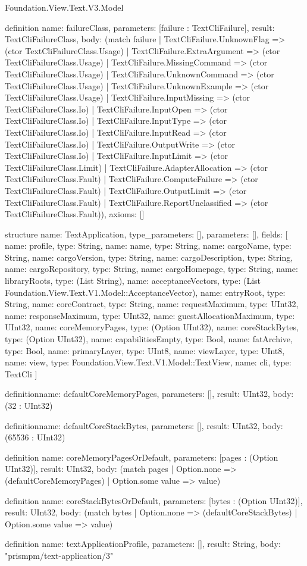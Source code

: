\begin{lexlean}{Foundation.View.Text.V3.Model}
\begin{semanticmodule}
definition{
  name: failureClass,
  parameters: [failure : TextCliFailure],
  result: TextCliFailureClass,
  body: (match failure
    | TextCliFailure.UnknownFlag => (ctor TextCliFailureClass.Usage)
    | TextCliFailure.ExtraArgument => (ctor TextCliFailureClass.Usage)
    | TextCliFailure.MissingCommand => (ctor TextCliFailureClass.Usage)
    | TextCliFailure.UnknownCommand => (ctor TextCliFailureClass.Usage)
    | TextCliFailure.UnknownExample => (ctor TextCliFailureClass.Usage)
    | TextCliFailure.InputMissing => (ctor TextCliFailureClass.Io)
    | TextCliFailure.InputOpen => (ctor TextCliFailureClass.Io)
    | TextCliFailure.InputType => (ctor TextCliFailureClass.Io)
    | TextCliFailure.InputRead => (ctor TextCliFailureClass.Io)
    | TextCliFailure.OutputWrite => (ctor TextCliFailureClass.Io)
    | TextCliFailure.InputLimit => (ctor TextCliFailureClass.Limit)
    | TextCliFailure.AdapterAllocation => (ctor TextCliFailureClass.Fault)
    | TextCliFailure.ComputeFailure => (ctor TextCliFailureClass.Fault)
    | TextCliFailure.OutputLimit => (ctor TextCliFailureClass.Fault)
    | TextCliFailure.ReportUnclassified => (ctor TextCliFailureClass.Fault)),
  axioms: []
}

structure{
  name: TextApplication,
  type_parameters: [],
  parameters: [],
  fields: [
    {name: profile, type: String},
    {name: name, type: String},
    {name: cargoName, type: String},
    {name: cargoVersion, type: String},
    {name: cargoDescription, type: String},
    {name: cargoRepository, type: String},
    {name: cargoHomepage, type: String},
    {name: libraryRoots, type: (List String)},
    {name: acceptanceVectors, type: (List Foundation.View.Text.V1.Model::AcceptanceVector)},
    {name: entryRoot, type: String},
    {name: coreContract, type: String},
    {name: requestMaximum, type: UInt32},
    {name: responseMaximum, type: UInt32},
    {name: guestAllocationMaximum, type: UInt32},
    {name: coreMemoryPages, type: (Option UInt32)},
    {name: coreStackBytes, type: (Option UInt32)},
    {name: capabilitiesEmpty, type: Bool},
    {name: fatArchive, type: Bool},
    {name: primaryLayer, type: UInt8},
    {name: viewLayer, type: UInt8},
    {name: view, type: Foundation.View.Text.V1.Model::TextView},
    {name: cli, type: TextCli}
  ]
}

definition{name: defaultCoreMemoryPages, parameters: [], result: UInt32, body: (32 : UInt32)}

definition{name: defaultCoreStackBytes, parameters: [], result: UInt32, body: (65536 : UInt32)}

definition{
  name: coreMemoryPagesOrDefault,
  parameters: [pages : (Option UInt32)],
  result: UInt32,
  body: (match pages | Option.none => (defaultCoreMemoryPages) | Option.some value => value)
}

definition{
  name: coreStackBytesOrDefault,
  parameters: [bytes : (Option UInt32)],
  result: UInt32,
  body: (match bytes | Option.none => (defaultCoreStackBytes) | Option.some value => value)
}

definition{
  name: textApplicationProfile,
  parameters: [],
  result: String,
  body: "prismpm/text-application/3"
}
\end{semanticmodule}
\end{lexlean}
